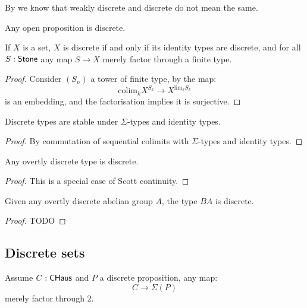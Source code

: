 By  we know that weakly discrete and discrete do not mean the same.

\begin{corollary}
Any open proposition is discrete.
\end{corollary}

\begin{lemma}\label{set-discrete}
If $X$ is a set, $X$ is discrete if and only if its identity types are discrete, and for all $S:\mathsf{Stone}$ any map $S\to X$ merely factor through a finite type.
\end{lemma}

\begin{proof}
Consider $(S_n)$ a tower of finite type,  by  the map:
\[\mathrm{colim}_kX^{S_k} \to X^{\mathrm{lim}_kS_k}\]
is an embedding, and the factorisation implies it is surjective.
\end{proof}

\begin{lemma}
Discrete types are stable under $\Sigma$-types and identity types.
\end{lemma}

\begin{proof}
By commutation of sequential colimits with $\Sigma$-types and identity types.
\end{proof}

\begin{lemma}
Any overtly discrete type is discrete.
\end{lemma}

\begin{proof}
This is a special case of Scott continuity.
\end{proof}

\begin{lemma}
Given any overtly discrete abelian group $A$, the type $BA$ is discrete.
\end{lemma}

\begin{proof}
TODO 
\end{proof}


\subsection{Discrete sets}

\begin{lemma}\label{factorisation-suspension-discrete}
Assume $C:\mathsf{CHaus}$ and $P$ a discrete proposition, any map:
\[C\to \Sigma(P)\]
merely factor through $2$. 
\end{lemma}

